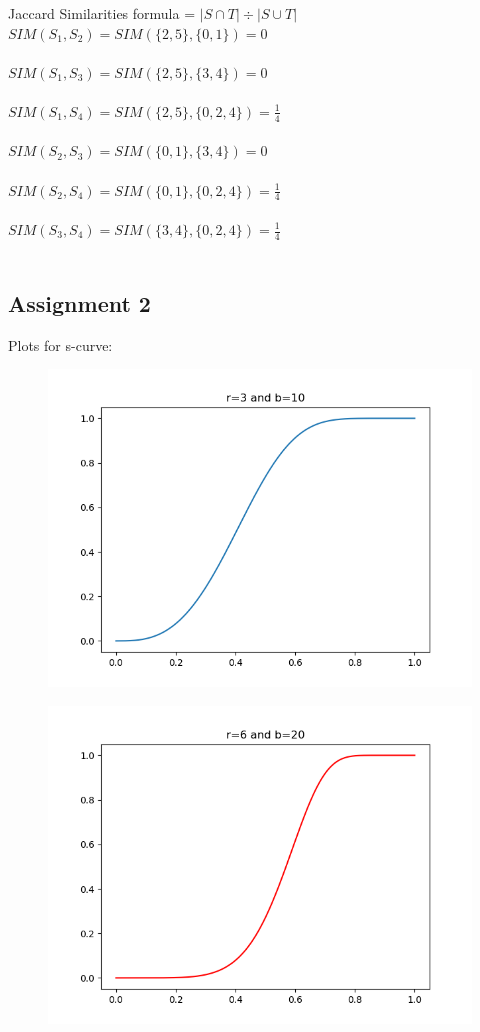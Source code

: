 \documentclass[]{scrartcl}
\begin{document}
\vspace{1cm}

Jaccard Similarities formula = $|S \cap T| \div |S \cup T|$ \\

$SIM(S_1, S_2) = SIM(\{2, 5\}, \{0, 1\}) = 0$\\\\
$SIM(S_1, S_3) = SIM(\{2, 5\},\{3, 4\}) = 0$\\\\
$SIM(S_1, S_4) = SIM(\{2, 5\}, \{0, 2, 4\}) = \frac{1}{4}$\\\\
$SIM(S_2, S_3) = SIM(\{0, 1\}, \{3, 4\}) = 0$\\\\
$SIM(S_2, S_4) = SIM(\{0, 1\}, \{0, 2, 4\}) = \frac{1}{4}$\\\\
$SIM(S_3, S_4) = SIM(\{3, 4\}, \{0, 2, 4\}) = \frac{1}{4}$\\\\

\subsection*{Assignment 2}

Plots for s-curve:

\begin{figure}[h!]
	\centering
	\includegraphics[width=0.5\linewidth]{Exercise4_plots/plot_1}
\end{figure}

\begin{figure}[h!]
	\centering
	\includegraphics[width=0.5\linewidth]{Exercise4_plots/plot_2}
\end{figure}
\end{document}
